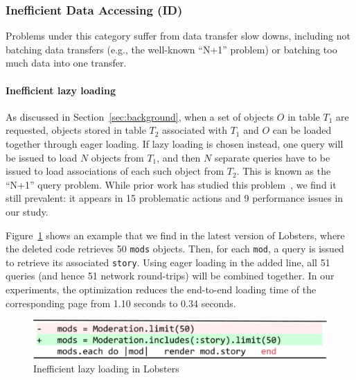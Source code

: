 \vspace{-0.08in} 
\subsubsection{Inefficient Data Accessing (ID)} 
\label{sec:iffidata}
Problems under this category suffer from data transfer slow downs, including not batching data transfers (e.g., the well-known ``N+1'' problem) or batching too much data into one transfer.

\vspace{-0.08in} 
\paragraph{\bf{Inefficient lazy loading}}
As discussed in Section~\ref{sec:background}, when a set of objects $O$ in table $T_1$ are requested, objects stored in table $T_2$ associated with $T_1$ and $O$ can be loaded together through eager loading. If lazy loading is chosen instead, 
one query will be issued to load $N$ objects from $T_1$, and then
$N$ separate queries have to be issued to load associations of each such object from $T_2$. This is known as the ``N+1'' query problem. While prior work has studied this problem~\cite{nplusone, cheung:sigmod14:sloth, bullet}, we find it still prevalent: it appears in 15 problematic actions and 9 performance issues in our study. 

Figure~\ref{fig:nplusone} shows an example that we find in the latest version of Lobsters, where the deleted code retrieves 50 \texttt{mods} objects. Then, for each \texttt{mod}, a query is issued to retrieve its associated \texttt{story}. Using eager loading in the added line, all 51 queries (and hence 51 network round-trips) will be combined together. In our experiments, the optimization reduces the end-to-end loading time of the corresponding page from 1.10 seconds to 0.34 seconds.



\begin{figure}
  \centering
  \includegraphics[width=0.7\columnwidth]{hownotto/moderations}
  \caption{Inefficient lazy loading in Lobsters}
  \label{fig:nplusone}
\end{figure}

